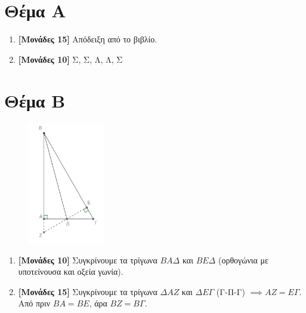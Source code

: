 \documentclass[12pt]{article}
\begin{document}
\section*{Θέμα Α}
  \noindent
  \begin{enumerate}
    \item \textbf{[Μονάδες 15]} Απόδειξη από το βιβλίο.
    \item \textbf{[Μονάδες 10]} Σ, Σ, Λ, Λ, Σ
  \end{enumerate}

\section*{Θέμα Β}
  \noindent
  \begin{figure}
    \centering
    \vspace{-140pt}
    \includegraphics[width=0.3\textwidth]{2017AGeo2}
  \end{figure}
  \begin{enumerate}
    \item \textbf{[Μονάδες 10]} Συγκρίνουμε τα τρίγωνα $ΒΑΔ$ και $ΒΕΔ$ (ορθογώνια με υποτείνουσα και οξεία γωνία).
    \item \textbf{[Μονάδες 15]} Συγκρίνουμε τα τρίγωνα $ΔΑΖ$ και $ΔΕΓ$ (Γ-Π-Γ) $\implies ΑΖ=ΕΓ$. Από πριν $ΒΑ=ΒΕ$, άρα $ΒΖ=ΒΓ$.
  \end{enumerate}
\end{document}
